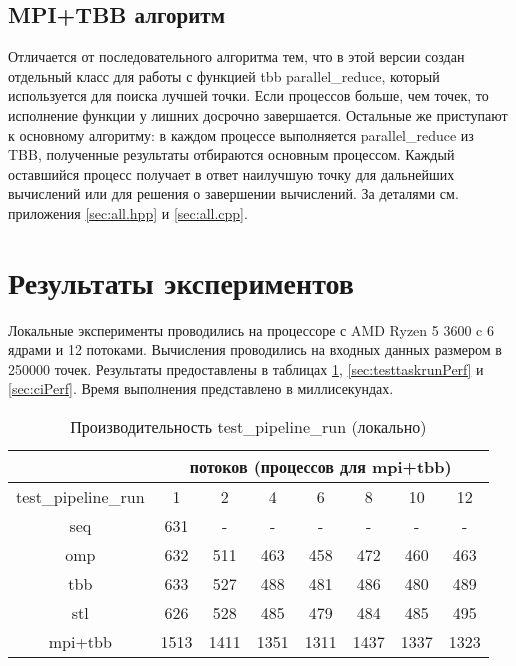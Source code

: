 \documentclass[12pt,a4paper]{extarticle}
\begin{document}
\subsection{MPI+TBB алгоритм}
Отличается от последовательного алгоритма тем, что в этой версии создан отдельный класс для работы с функцией tbb parallel\_reduce, который используется для поиска лучшей точки.
Если процессов больше, чем точек, то исполнение функции у лишних досрочно завершается. Остальные же приступают к основному алгоритму: в каждом процессе выполняется parallel\_reduce из TBB, полученные результаты отбираются основным процессом. Каждый оставшийся процесс получает в ответ наилучшую точку для дальнейших вычислений или для решения о завершении вычислений.
За деталями см. приложения \ref{sec:all.hpp} и \ref{sec:all.cpp}.

\newpage
\section{Результаты экспериментов}
Локальные эксперименты проводились на процессоре с AMD Ryzen 5 3600 c 6 ядрами и 12 потоками. Вычисления проводились на входных данных размером в 250000 точек.
Результаты предоставлены в таблицах \ref{sec:testpipelinerunPerf}, \ref{sec:testtaskrunPerf} и \ref{sec:ciPerf}. Время выполнения представлено в миллисекундах.

\begin{table}[H]
\centering
\begin{tabular}{|c|c|c|c|c|c|c|c|} \hline
 & \multicolumn{7}{|c|}{потоков (процессов для mpi+tbb)}\\
\hline
test\_pipeline\_run & 1 & 2 & 4 & 6 & 8 & 10 & 12 \\
\hline
seq & 631 &  -&-&-&-&-&-\\
\hline
omp & 632 & 511 & 463 & 458 & 472 & 460 & 463 \\
\hline
tbb & 633 & 527 & 488 & 481 & 486 & 480 & 489 \\
\hline
stl & 626 & 528 & 485 & 479 & 484 & 485 & 495 \\
\hline
mpi+tbb & 1513 & 1411 & 1351 & 1311 & 1437 & 1337 & 1323 \\
\hline
\end{tabular}
\caption{Производительность test\_pipeline\_run (локально)}
\label{sec:testpipelinerunPerf}
\end{table}
\end{document}
